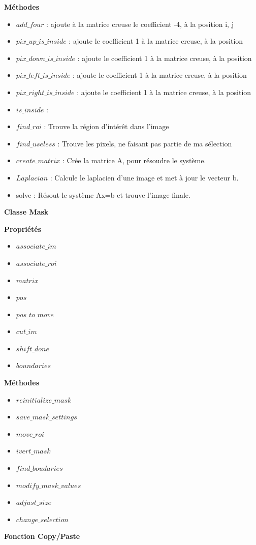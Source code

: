 \textbf{Méthodes}
\begin{itemize}
\item $add\_four$ : ajoute à la matrice creuse le coefficient -4, à la position i, j
\item $pix\_up\_is\_inside$ : ajoute le coefficient 1 à la matrice creuse, à la position
\item $pix\_down\_is\_inside$ : ajoute le coefficient 1 à la matrice creuse, à la position
\item $pix\_left\_is\_inside$ : ajoute le coefficient 1 à la matrice creuse, à la position
\item $pix\_right\_is\_inside$ : ajoute le coefficient 1 à la matrice creuse, à la position
\item $is\_inside$ : 
\item $find\_roi$ :  Trouve la région d'intérêt dans l'image
\item $find\_useless$ : Trouve les pixels, ne faisant pas partie de ma sélection
\item $create\_matrix$  : Crée la matrice A, pour résoudre le système.
\item $Laplacian$ :  Calcule le laplacien d'une image et met à jour le vecteur b.
\item solve :  Résout le système Ax=b et trouve l'image finale.
\end{itemize}

\begin{center}
\textbf{Classe Mask}\\
\end{center}
\textbf{Propriétés}\\
\begin{itemize}
\item $associate\_im$
\item $associate\_roi$
\item $matrix$
\item $pos$
\item $pos\_to\_move$
\item $cut\_im$
\item $shift\_done$
\item $boundaries$
\end{itemize}
\textbf{Méthodes}
\begin{itemize}
\item $reinitialize\_mask$
\item $save\_mask\_settings$
\item $move\_roi$
\item $ivert\_mask$
\item $find\_boudaries$
\item $modify\_mask\_values$
\item $adjust\_size$
\item $change\_selection$
\end{itemize}
\begin{center}
\textbf{Fonction Copy/Paste}
\end{center}
